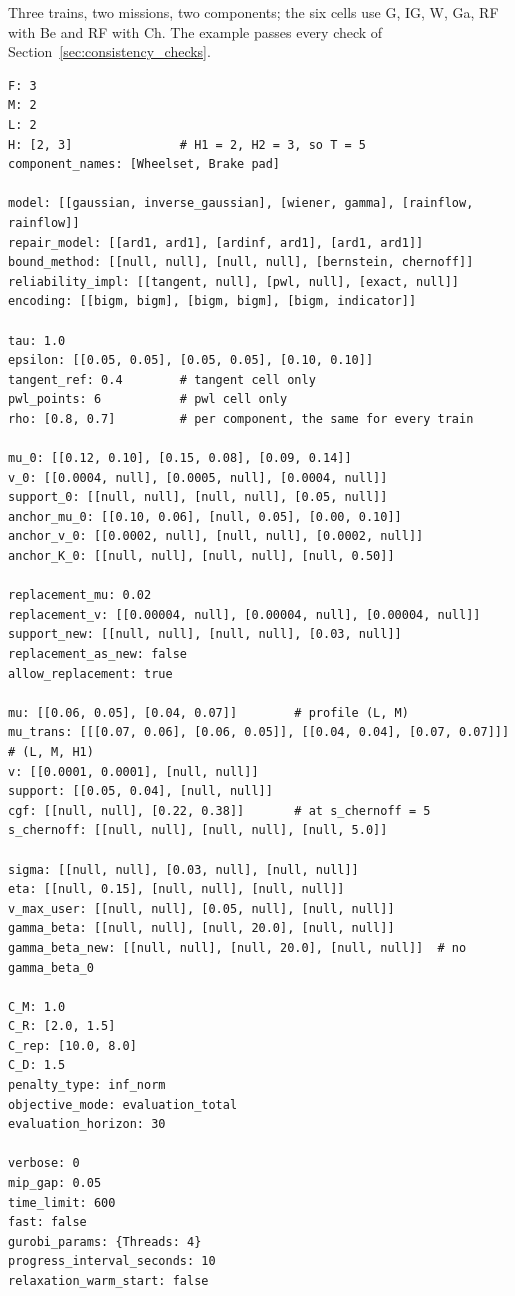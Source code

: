 Three trains, two missions, two components; the six cells use G, IG, W, Ga, RF with Be and RF with Ch.
The example passes every check of Section~\ref{sec:consistency_checks}.

\begin{lstlisting}
F: 3
M: 2
L: 2
H: [2, 3]               # H1 = 2, H2 = 3, so T = 5
component_names: [Wheelset, Brake pad]

model: [[gaussian, inverse_gaussian], [wiener, gamma], [rainflow, rainflow]]
repair_model: [[ard1, ard1], [ardinf, ard1], [ard1, ard1]]
bound_method: [[null, null], [null, null], [bernstein, chernoff]]
reliability_impl: [[tangent, null], [pwl, null], [exact, null]]
encoding: [[bigm, bigm], [bigm, bigm], [bigm, indicator]]

tau: 1.0
epsilon: [[0.05, 0.05], [0.05, 0.05], [0.10, 0.10]]
tangent_ref: 0.4        # tangent cell only
pwl_points: 6           # pwl cell only
rho: [0.8, 0.7]         # per component, the same for every train

mu_0: [[0.12, 0.10], [0.15, 0.08], [0.09, 0.14]]
v_0: [[0.0004, null], [0.0005, null], [0.0004, null]]
support_0: [[null, null], [null, null], [0.05, null]]
anchor_mu_0: [[0.10, 0.06], [null, 0.05], [0.00, 0.10]]
anchor_v_0: [[0.0002, null], [null, null], [0.0002, null]]
anchor_K_0: [[null, null], [null, null], [null, 0.50]]

replacement_mu: 0.02
replacement_v: [[0.00004, null], [0.00004, null], [0.00004, null]]
support_new: [[null, null], [null, null], [0.03, null]]
replacement_as_new: false
allow_replacement: true

mu: [[0.06, 0.05], [0.04, 0.07]]        # profile (L, M)
mu_trans: [[[0.07, 0.06], [0.06, 0.05]], [[0.04, 0.04], [0.07, 0.07]]]  # (L, M, H1)
v: [[0.0001, 0.0001], [null, null]]
support: [[0.05, 0.04], [null, null]]
cgf: [[null, null], [0.22, 0.38]]       # at s_chernoff = 5
s_chernoff: [[null, null], [null, null], [null, 5.0]]

sigma: [[null, null], [0.03, null], [null, null]]
eta: [[null, 0.15], [null, null], [null, null]]
v_max_user: [[null, null], [0.05, null], [null, null]]
gamma_beta: [[null, null], [null, 20.0], [null, null]]
gamma_beta_new: [[null, null], [null, 20.0], [null, null]]  # no gamma_beta_0

C_M: 1.0
C_R: [2.0, 1.5]
C_rep: [10.0, 8.0]
C_D: 1.5
penalty_type: inf_norm
objective_mode: evaluation_total
evaluation_horizon: 30

verbose: 0
mip_gap: 0.05
time_limit: 600
fast: false
gurobi_params: {Threads: 4}
progress_interval_seconds: 10
relaxation_warm_start: false
\end{lstlisting}
